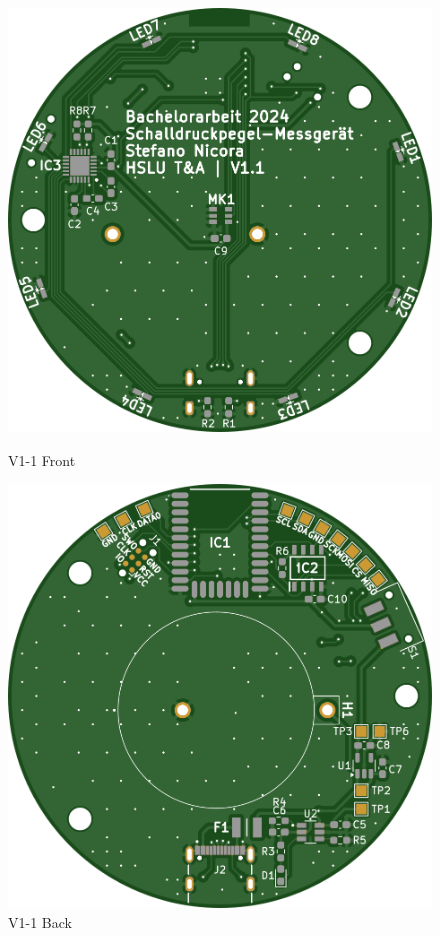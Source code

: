 \documentclass[12pt]{article}
\begin{document}
	\begin{figure}[H]
		\centering
		\begin{minipage}{.5\textwidth}
			\thispagestyle{empty} 
			\centering
			\includegraphics[width=1\linewidth]{images/BAT_PCB_V1-1_top}
			\caption[]{V1-1 Front}
			\label{fig:pcb_V1-1_front}
		\end{minipage}%
		\begin{minipage}{.5\textwidth}
			\thispagestyle{empty} 
			\centering
			\includegraphics[width=1\linewidth]{images/BAT_PCB_V1-1_bottom}
			\caption[]{V1-1 Back}
			\label{fig:pcb_V1-1_back}
		\end{minipage}
	\end{figure}
\end{document}
